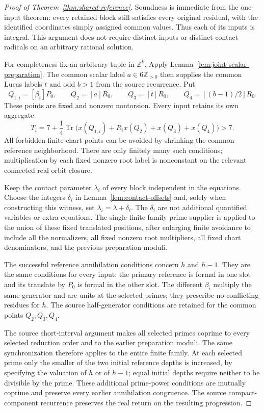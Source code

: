 \documentclass[11pt]{article}
\begin{document}
\begin{proof}[Proof of Theorem~\ref{thm:shared-reference}]
Soundness is immediate from the one-input theorem: every retained
block still satisfies every original residual, with the identified
coordinates simply assigned common values.  Thus each of its inputs
is integral.  This argument does not require distinct inputs or
distinct contact radicals on an arbitrary rational solution.

For completeness fix an arbitrary tuple in $\mathbb Z^k$.  Apply
Lemma~\ref{lem:joint-scalar-preparation}.  The common scalar label
$a\in6\mathbb Z_{>0}$ then supplies the common Lucas labels $t$ and
odd $b>1$ from the source recurrence.  Put
\[
 Q_{1,i}=[\beta_i]P_0,\qquad Q_2=[a]R_0,\qquad
 Q_3=[t]R_0,\qquad Q_4=[(b-1)/2]R_0.
\]
These points are fixed and nonzero nontorsion.  Every input retains
its own aggregate
\[
 T_i=7+\frac14\operatorname{Tr}
          \bigl(x(Q_{1,i})+R_i x(Q_2)+x(Q_3)+x(Q_4)\bigr)>7.
\]
All forbidden finite chart points can be avoided by shrinking the
common reference neighborhood.  There are only finitely many such
conditions; multiplication by each fixed nonzero root label is
nonconstant on the relevant connected real orbit closure.

Keep the contact parameter $\lambda_i$ of every block independent
in the equations.  Choose the integers $\delta_i$ in
Lemma~\ref{lem:contact-offsets} and, solely when constructing this
witness, set $\lambda_i=\lambda+\delta_i$.  The $\delta_i$ are
not additional quantified variables or extra equations.  The single
finite-family prime supplier is applied to the union of these fixed
translated positions, after enlarging finite avoidance to include
all the normalizers, all fixed nonzero root multipliers, all fixed
chart denominators, and the previous preparation moduli.

The successful reference annihilation conditions concern $h$ and
$h-1$.  They are the same conditions for every input: the primary
reference is formal in one slot and its translate by $P_0$ is formal
in the other slot.  The different $\beta_i$ multiply the same
generator and are units at the selected primes; they prescribe no
conflicting residues for $h$.  The source half-generator conditions
are retained for the common points $Q_2,Q_3,Q_4$.

The source short-interval argument makes all selected primes
coprime to every selected reduction order and to the earlier
preparation moduli.  The same synchronization therefore applies to
the entire finite family.  At each selected prime only the smaller
of the two initial reference depths is increased, by specifying the
valuation of $h$ or of $h-1$; equal initial depths require neither
to be divisible by the prime.  These additional prime-power
conditions are mutually coprime and preserve every earlier
annihilation congruence.  The source compact-component recurrence
preserves the real return on the resulting progression.


\end{proof}
\end{document}
